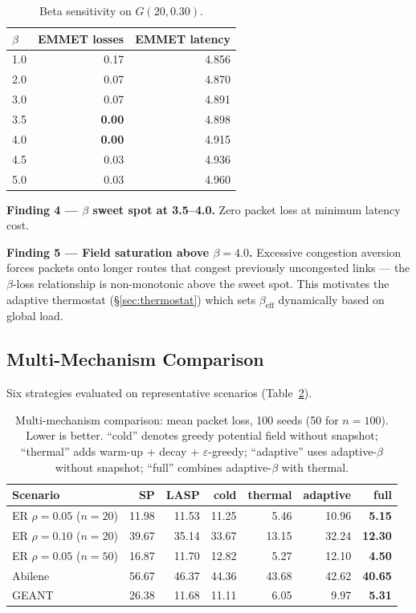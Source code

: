 \documentclass[11pt,a4paper]{article}
\begin{document}
\begin{table}[h]
\centering
\caption{Beta sensitivity on $G(20, 0.30)$.}
\label{tab:beta}
\begin{tabular}{lrr}
\toprule
$\beta$ & EMMET losses & EMMET latency \\
\midrule
1.0 & 0.17          & 4.856 \\
2.0 & 0.07          & 4.870 \\
3.0 & 0.07          & 4.891 \\
3.5 & \textbf{0.00} & 4.898 \\
4.0 & \textbf{0.00} & 4.915 \\
4.5 & 0.03          & 4.936 \\
5.0 & 0.03          & 4.960 \\
\bottomrule
\end{tabular}
\end{table}

\textbf{Finding 4 --- $\beta$ sweet spot at 3.5--4.0.} Zero packet loss
at minimum latency cost.

\textbf{Finding 5 --- Field saturation above $\beta = 4.0$.} Excessive
congestion aversion forces packets onto longer routes that congest
previously uncongested links --- the $\beta$-loss relationship is
non-monotonic above the sweet spot. This motivates the adaptive
thermostat (\S\ref{sec:thermostat}) which sets
$\beta_{\mathrm{eff}}$ dynamically based on global load.

\subsection{Multi-Mechanism Comparison}

Six strategies evaluated on representative scenarios
(Table~\ref{tab:multi}).

\begin{table}[h]
\centering
\caption{Multi-mechanism comparison: mean packet loss, 100 seeds (50
for $n{=}100$). Lower is better. ``cold'' denotes greedy potential field
without snapshot; ``thermal'' adds warm-up + decay +
$\varepsilon$-greedy; ``adaptive'' uses adaptive-$\beta$ without
snapshot; ``full'' combines adaptive-$\beta$ with thermal.}
\label{tab:multi}
\small
\begin{tabular}{lrrrrrr}
\toprule
Scenario & SP & LASP & cold & thermal & adaptive & full \\
\midrule
ER $\rho{=}0.05$ ($n{=}20$) & 11.98 & 11.53 & 11.25 & 5.46    & 10.96    & \textbf{5.15}  \\
ER $\rho{=}0.10$ ($n{=}20$) & 39.67 & 35.14 & 33.67 & 13.15   & 32.24    & \textbf{12.30} \\
ER $\rho{=}0.05$ ($n{=}50$) & 16.87 & 11.70 & 12.82 & 5.27    & 12.10    & \textbf{4.50}  \\
Abilene                     & 56.67 & 46.37 & 44.36 & 43.68   & 42.62    & \textbf{40.65} \\
GEANT                       & 26.38 & 11.68 & 11.11 & 6.05    & 9.97     & \textbf{5.31}  \\
\bottomrule
\end{tabular}
\end{table}
\end{document}
